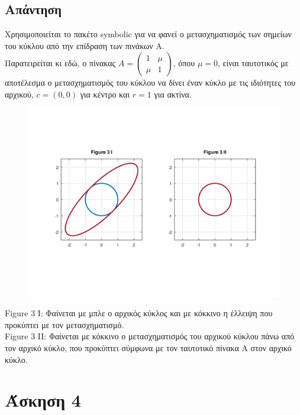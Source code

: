 \documentclass[a4paper,12pt]{article}
\begin{document}
\subsection{Απάντηση}
Χρησιμοποιείται το πακέτο symbolic για να φανεί ο μετασχηματισμός των σημείων
του κύκλου από την επίδραση των πινάκων Α.\\
Παρατειρείται κι εδώ, ο πίνακας $
	A = \begin{pmatrix}
		1   & \mu \\
		\mu & 1
	\end{pmatrix}
$, όπου $\mu = 0$, είναι ταυτοτικός με αποτέλεσμα ο μετασχηματισμός του κύκλου
να δίνει έναν κύκλο με τις ιδιότητες του αρχικού, $c=(0, 0)$ για κέντρο και 
$r=1$ για ακτίνα.
\begin{center}
	\begin{figure}[H]
		\centering
		\includegraphics[scale=0.7]{3i_ii.png}
	\end{figure}
	Figure 3 I: Φαίνεται με μπλε ο αρχικός κύκλος και με κόκκινο η έλλειψη που
	προκύπτει με τον μετασχηματισμό.\\
	Figure 3 II: Φαίνεται με κόκκινο ο μετασχηματισμός του αρχικού κύκλου πάνω
	από τον αρχικό κύκλο, που προκύπτει σύμφωνα με τον ταυτοτικό πίνακα Α
	στον αρχικό κύκλο.
\end{center}

\newpage\section{Άσκηση 4}
\end{document}
